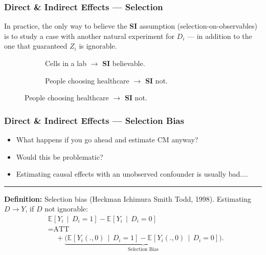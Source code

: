 \documentclass[dvipsnames]{beamer} %
\newcommand{\Egiven}[3][]{\mathbb{E}_{#1} \left[ #2 \, \middle\vert \, #3 \right]} %
\begin{document}
\begin{frame}[noframenumbering]
    \frametitle{Direct \& Indirect Effects --- Selection}
    In practice, the only way to believe the \textbf{SI} assumption (selection-on-observables) is to study a case with another natural experiment for $D_i$ --- in addition to the one that guaranteed $Z_i$ is ignorable.
    \vskip-0.5cm
    \begin{figure}[h!]
        \centering
        \singlespacing
        \begin{subfigure}[c]{0.475\textwidth}
            \centering
            \caption{Cells in a lab
                $\to$ \textbf{SI} believable.}
        \end{subfigure}
        \begin{subfigure}[c]{0.475\textwidth}
            \centering
            \caption{People choosing healthcare
                $\to$ \textbf{SI} not.}
        \end{subfigure}
    \end{figure}
\end{frame}
\begin{frame}
    \frametitle{Direct \& Indirect Effects --- Selection Bias}
    \begin{itemize}
        \item What happens if you go ahead and estimate CM anyway?
        \item Would this be problematic?
        \item Estimating causal effects with an unobserved confounder is usually bad$\hdots$.
    \end{itemize}
    \par\noindent\rule{\textwidth}{0.4pt}
    \vskip0.25cm
    \textbf{Definition:} Selection bias (Heckman Ichimura Smith Todd, 1998).
    \vskip0.25cm
    Estimating $D \to Y$, if $D$ not ignorable:
    \begin{align*}
        &\Egiven{ Y_i}{D_i =1} - \Egiven{ Y_i}{D_i =0} \\
        &= \text{ATT} \\
        &\;\;\;\; + \underbrace{\Big(
            \Egiven{ Y_i(.,0)}{D_i =1} - \Egiven{ Y_i(.,0)}{D_i =0} \Big)}_{
                \text{Selection Bias}}.
    \end{align*}
    \vskip1.125cm
\end{frame}
\end{document}

